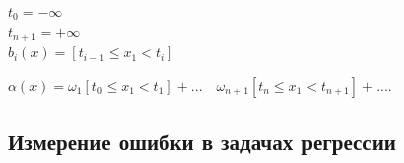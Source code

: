 \begin{enumerate}
                \begin{center}
                    $t_0 = - \infty$\\
                    $t_{n+1} = + \infty$\\

                    $b_i(x) = [t_{i-1} \leq x_1 < t_{i}]$\\

                \end{center}
                
                \begin{center}
                    \large{$\alpha(x) = \omega_1 [t_0 \leq x_1 < t_1] + ... \quad \omega_{n+1}[t_n \leq x_1 < t_{n+1}] + ....$}

                \end{center}

        \end{enumerate}

        \subsection{Измерение ошибки в задачах регрессии}

